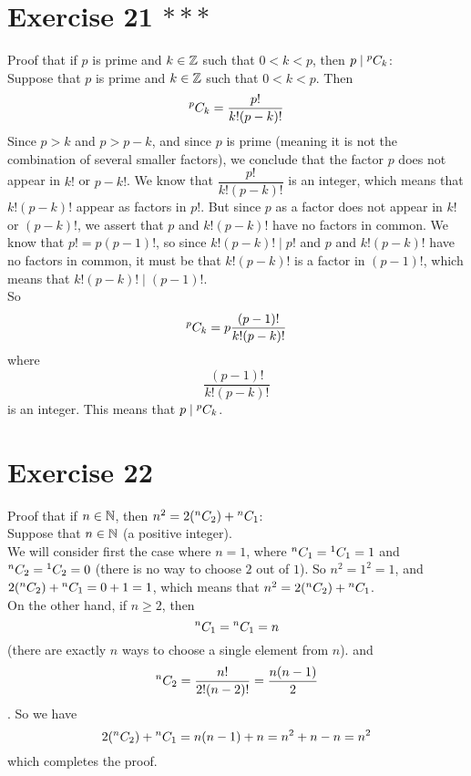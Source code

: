 \documentclass[12pt]{article}
\begin{document}
    \section*{Exercise 21 $***$}
    Proof that if $p$ is prime and $k \in \mathbb{Z}$
    such that $0 < k < p$,
    then $p \mid {}^{p}C_{k}$: \\
    Suppose that $p$ is prime and $k \in \mathbb{Z}$
    such that $0 < k < p$.
    Then 
    \[ {}^{p}C_{k} = \dfrac{p!}{k!(p-k)!} \]
    Since $p > k$ and $p > p - k$,
    and since $p$ is prime
    (meaning it is not the combination of several smaller factors),
    we conclude that the factor $p$ does not appear in $k!$ or $p-k!$.
    We know that $\dfrac{p!}{k!(p-k)!}$ is an integer,
    which means that $k!(p-k)!$ appear as factors in $p!$.
    But since $p$ as a factor does not appear in $k!$ or $(p-k)!$,
    we assert that $p$ and $k!(p-k)!$ have no factors in common.
    We know that $p! = p(p-1)!$,
    so since $k!(p-k)! \mid p!$
    and $p$ and $k!(p-k)!$ have no factors in common,
    it must be that $k!(p-k)!$ is a factor in $(p-1)!$,
    which means that $k!(p-k)! \mid (p-1)!$. \\
    So 
    \[ {}^{p}C_{k} = p\dfrac{(p-1)!}{k!(p-k)!} \]
    where
    \[ \dfrac{(p-1)!}{k!(p-k)!} \]
    is an integer.
    This means that $p \mid {}^{p}C_{k}$. \\

    \section*{Exercise 22}
    Proof that if $n \in \mathbb{N}$,
    then $n^2 = 2({}^{n}C_{2}) + {}^{n}C_{1}$: \\
    Suppose that $n \in \mathbb{N}$ (a positive integer). \\
    We will consider first the case where $n = 1$,
    where ${}^{n}C_{1} = {}^{1}C_{1} = 1$
    and ${}^{n}C_{2} = {}^{1}C_{2} = 0$
    (there is no way to choose $2$ out of $1$).
    So $n^2 = 1^2 = 1$,
    and $2({}^{n}C_{2}) + {}^{n}C_{1} = 0 + 1 = 1$,
    which means that $n^2 = 2({}^{n}C_{2}) + {}^{n}C_{1}$. \\
    On the other hand,
    if $n \geqslant 2$,
    then 
    \[ {}^{n}C_{1} = {}^{n}C_{1} = n \]
    (there are exactly $n$ ways to choose a single element from $n$).
    and
    \[ {}^{n}C_{2} = \dfrac{n!}{2!(n-2)!}
    = \dfrac{n(n-1)}{2} \].
    So we have
    \[ 2({}^{n}C_{2}) + {}^{n}C_{1} = n(n-1) + n = n^2 + n - n = n^2 \]
    which completes the proof. \\
\end{document}
